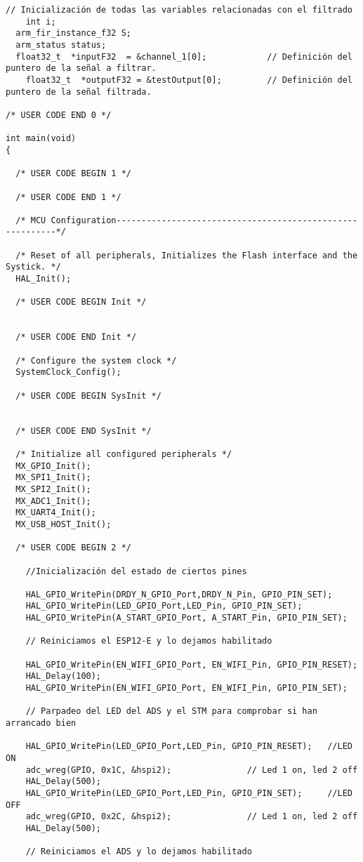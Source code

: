 \begin{lstlisting}[label=algoritmo:main.c,style = STM-code,frame=single,caption=main.c]
// Inicialización de todas las variables relacionadas con el filtrado
	int i;
  arm_fir_instance_f32 S;
  arm_status status;
  float32_t  *inputF32 	= &channel_1[0];			// Definición del puntero de la señal a filtrar.
	float32_t  *outputF32 = &testOutput[0];			// Definición del puntero de la señal filtrada.

/* USER CODE END 0 */

int main(void)
{

  /* USER CODE BEGIN 1 */
	
  /* USER CODE END 1 */

  /* MCU Configuration----------------------------------------------------------*/

  /* Reset of all peripherals, Initializes the Flash interface and the Systick. */
  HAL_Init();

  /* USER CODE BEGIN Init */

	
  /* USER CODE END Init */

  /* Configure the system clock */
  SystemClock_Config();

  /* USER CODE BEGIN SysInit */
	
		
  /* USER CODE END SysInit */

  /* Initialize all configured peripherals */
  MX_GPIO_Init();
  MX_SPI1_Init();
  MX_SPI2_Init();
  MX_ADC1_Init();
  MX_UART4_Init();
  MX_USB_HOST_Init();

  /* USER CODE BEGIN 2 */
	
	//Inicialización del estado de ciertos pines
	
	HAL_GPIO_WritePin(DRDY_N_GPIO_Port,DRDY_N_Pin, GPIO_PIN_SET);
	HAL_GPIO_WritePin(LED_GPIO_Port,LED_Pin, GPIO_PIN_SET);
	HAL_GPIO_WritePin(A_START_GPIO_Port, A_START_Pin, GPIO_PIN_SET);

	// Reiniciamos el ESP12-E y lo dejamos habilitado
	
	HAL_GPIO_WritePin(EN_WIFI_GPIO_Port, EN_WIFI_Pin, GPIO_PIN_RESET);
	HAL_Delay(100);
	HAL_GPIO_WritePin(EN_WIFI_GPIO_Port, EN_WIFI_Pin, GPIO_PIN_SET);

	// Parpadeo del LED del ADS y el STM para comprobar si han arrancado bien
	
	HAL_GPIO_WritePin(LED_GPIO_Port,LED_Pin, GPIO_PIN_RESET); 	//LED ON
	adc_wreg(GPIO, 0x1C, &hspi2);				// Led 1 on, led 2 off
	HAL_Delay(500);
	HAL_GPIO_WritePin(LED_GPIO_Port,LED_Pin, GPIO_PIN_SET); 	//LED OFF
	adc_wreg(GPIO, 0x2C, &hspi2);				// Led 1 on, led 2 off
	HAL_Delay(500);
	
	// Reiniciamos el ADS y lo dejamos habilitado


\end{lstlisting}
